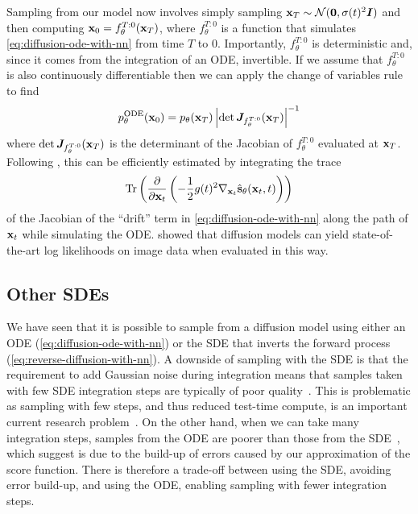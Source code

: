 Sampling from our model now involves simply sampling ${\mathbf{x}}_T \sim {\mathcal{N}}({\bm{0}}, \sigma(t)^2{\bm{I}})$ and then computing ${\mathbf{x}}_0 = f^{T:0}_\theta({\mathbf{x}}_T)$, where $f^{T:0}_\theta$ is a function that simulates \cref{eq:diffusion-ode-with-nn} from time $T$ to $0$. Importantly, $f^{T:0}_\theta$ is deterministic and, since it comes from the integration of an ODE, invertible. If we assume that $f^{T:0}_\theta$ is also continuously differentiable then we can apply the change of variables rule to find
\begin{equation}
    p_\theta^\text{ODE}({\mathbf{x}}_0) = p_\theta({\mathbf{x}}_T) \left| \det {\bm{J}}_{f^{T:0}_\theta}({\mathbf{x}}_T) \right|^{-1}
\end{equation}
where $\det {\bm{J}}_{f^{T:0}_\theta}({\mathbf{x}}_T)$ is the determinant of the Jacobian of $f^{T:0}_\theta$ evaluated at ${\mathbf{x}}_T$. Following \citet{chen2018neural}, this can be efficiently estimated by integrating the trace
\begin{equation}
    \text{Tr}\left( \frac{\partial}{\partial {\mathbf{x}}_t} \left( - \frac{1}{2} g(t)^2 \nabla_{{\mathbf{x}}_t} \hat{{\mathbf{s}}}_\theta({\mathbf{x}}_t, t) \right)
    \right)
\end{equation}
of the Jacobian of the ``drift'' term in \cref{eq:diffusion-ode-with-nn} along the path of ${\mathbf{x}}_t$ while simulating the ODE. \citet{song2020score} showed that diffusion models can yield state-of-the-art log likelihoods on image data when evaluated in this way.

\subsection{Other SDEs} \label{sec:other-sdes}
We have seen that it is possible to sample from a diffusion model using either an ODE (\cref{eq:diffusion-ode-with-nn}) or the SDE that inverts the forward process (\cref{eq:reverse-diffusion-with-nn}). A downside of sampling with the SDE is that the requirement to add Gaussian noise during integration means that samples taken with few SDE integration steps are typically of poor quality~\citep{song2020denoising,karras2022elucidating}. This is problematic as sampling with few steps, and thus reduced test-time compute, is an important current research problem~\citep{salimans2022progressive,meng2022distillation,esser2024scaling}. On the other hand, when we can take many integration steps, samples from the ODE are poorer than those from the SDE~\citep{song2020denoising}, which \citet{karras2022elucidating} suggest is due to the build-up of errors caused by our approximation of the score function. There is therefore a trade-off between using the SDE, avoiding error build-up, and using the ODE, enabling sampling with fewer integration steps.

